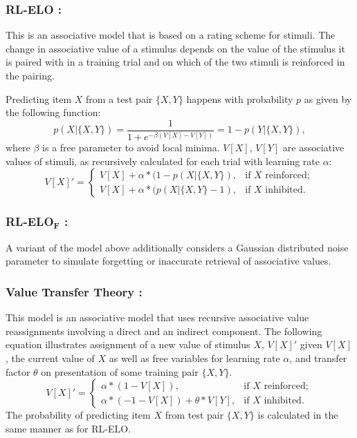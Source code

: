 \documentclass[10pt,letterpaper]{article}
\begin{document}
	\subsubsection{RL-ELO \cite{kumaran2016}:} This is an associative model that is based on a rating scheme for stimuli. The change in associative value of a stimulus depends on the value of the stimulus it is paired with in a training trial and on which of the two stimuli is reinforced in the pairing. 
	
	Predicting item $X$ from a test pair $\{X,Y\}$ happens with probability $p$ as given by the following function:
	\begin{equation*}
	p(X|{ \{X, Y\}}) = \frac{1}{1+e^{-\beta(V[X] - V[Y])}} = 1- p(Y| {\{X, Y\}}) ,
	\end{equation*}
	where $\beta$ is a free parameter to avoid local minima. $V[X]$, $V[Y]$ are associative values of stimuli, as recursively calculated for each trial with learning rate $\alpha$:
	\begin{equation*}
	V[X]' = \begin{cases}
	V[X] + \alpha * (1-p(X|\{X,Y\})
	, & \text{if $X$ reinforced};\\
	V[X] + \alpha * (p(X|\{X,Y\}-1)
	, & \text{if $X$ inhibited}.
	\end{cases}
	\end{equation*}
	
	\subsubsection{RL-ELO$_\textbf{F}$ \cite{kumaran2016}:} A variant of the model above additionally considers a Gaussian distributed noise parameter to simulate forgetting or inaccurate retrieval of associative values.
	\subsubsection{Value Transfer Theory \cite<VTT,>{vonfersen1991, kumaran2016}:} This model is an associative model that uses recursive associative value reassignments involving a direct and an indirect component. The following equation illustrates assignment of a new value of stimulus $X$, $V[X]'$ given $V[X]$, the current value of $X$ as well as free variables for learning rate $\alpha$, and transfer factor $\theta$ on presentation of some training pair $\{X,Y\}$.
	\begin{equation*}
	V[X]' = \begin{cases}
	\alpha * (1-V[X])
	, & \text{if $X$ reinforced};\\
	\alpha * (-1-V[X])
	+ \theta*V[Y]
	, & \text{if $X$ inhibited}.
	\end{cases}
	\end{equation*}
	The probability of predicting item $X$ from test pair $\{X,Y\}$ is calculated in the same manner as for RL-ELO.
\end{document}
